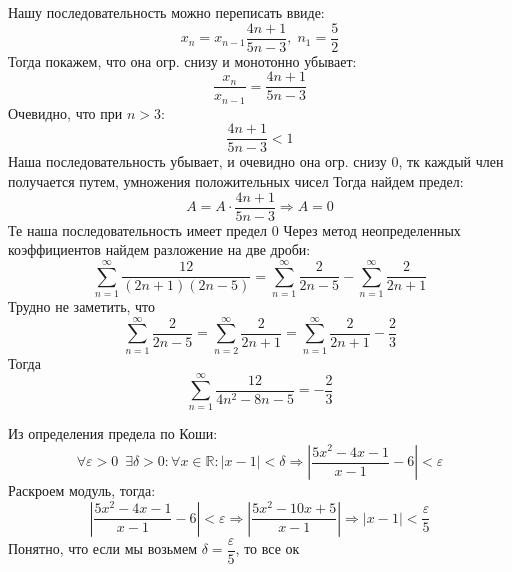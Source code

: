 \documentclass{report}
\begin{document}
\sol
Нашу последовательность можно переписать ввиде:
\begin{equation*}
	x_{n}=x_{n-1}\dfrac{4n+1}{5n-3}, \; n_1=\dfrac{5}{2}
\end{equation*}
Тогда покажем, что она огр. снизу и монотонно убывает:
\begin{equation*}
	\dfrac{x_n}{x_{n-1}}=\dfrac{4n+1}{5n-3}  \end{equation*}
Очевидно, что при $n>3$:
\begin{equation*}
\dfrac{4n+1}{5n-3}<1
\end{equation*}
Наша последовательность убывает, и очевидно она огр. снизу 0, тк каждый член получается путем, умножения положительных чисел
Тогда найдем предел:
\begin{equation*}
	A=A\cdot \dfrac{4n+1}{5n-3} \Rightarrow A=0
\end{equation*}
Те наша последовательность имеет предел 0
\sol
Через метод неопределенных коэффициентов найдем разложение на две дроби:
\[
	\sum_{n=1}^{\infty}\dfrac{12}{(2n+1)(2n-5)}=\sum_{n=1}^{\infty}\dfrac{2}{2n-5}-\sum_{n=1}^{\infty}\dfrac{2}{2n+1}
\]
Трудно не заметить, что \[\sum_{n=1}^{\infty}\dfrac{2}{2n-5}=\sum_{n=2}^{\infty}\dfrac{2}{2n+1}=\sum_{n=1}^{\infty}\dfrac{2}{2n+1}-\dfrac{2}{3} \]
Тогда \[ \sum_{n=1}^{\infty}\dfrac{12}{4n^2-8n-5}=-\dfrac{2}{3}\]



\sol
Из определения предела по Коши:
\begin{equation*}
\forall \varepsilon > 0 \enspace \exists \delta > 0: \forall x \in \mathbb{R}: \left| x-1\right|<\delta \Rightarrow \left|\dfrac{5x^2-4x-1}{x-1}-6\right|<\varepsilon
\end{equation*}
Раскроем модуль, тогда:
\begin{equation*}
\left|\dfrac{5x^2-4x-1}{x-1}-6\right|<\varepsilon \Rightarrow \left|\dfrac{5x^2-10x+5}{x-1}\right| \Rightarrow \left|x-1 \right|<\dfrac{\varepsilon}{5}
\end{equation*}
Понятно, что если мы возьмем $\delta=\dfrac{\varepsilon}{5}$, то все ок
\end{document}
